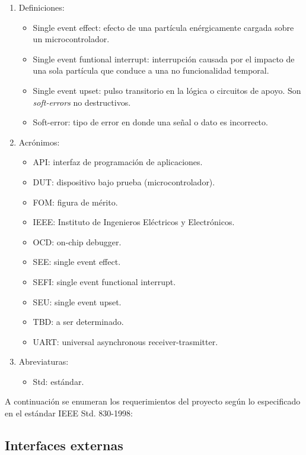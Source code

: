 \documentclass[
11pt, %
]{charter}
\begin{document}
\begin{enumerate}
	\item Definiciones:
	\begin{itemize}
		\item Single event effect: efecto de una partícula enérgicamente cargada sobre un microcontrolador.
		\item Single event funtional interrupt: interrupción causada por el impacto de una sola partícula que conduce a una no funcionalidad temporal.
		\item Single event upset: pulso transitorio en la lógica o circuitos de apoyo. Son \emph{soft-errors} no destructivos.
		\item Soft-error: tipo de error en donde una señal o dato es incorrecto.
	\end{itemize}
	\item Acrónimos:
	\begin{itemize}
		\item API: interfaz de programación de aplicaciones.
		\item DUT: dispositivo bajo prueba (microcontrolador).
		\item FOM: figura de mérito.
		\item IEEE: Instituto de Ingenieros Eléctricos y Electrónicos.
		\item OCD: on-chip debugger.
		\item SEE: single event effect.
		\item SEFI: single event functional interrupt.
		\item SEU: single event upset.
		\item TBD: a ser determinado.
		\item UART: universal asynchronous receiver-trasmitter.
	\end{itemize}
	\item Abreviaturas:
	\begin{itemize}
		\item Std: estándar.
	\end{itemize}
\end{enumerate}

A continuación se enumeran los requerimientos del proyecto según lo especificado en el estándar IEEE Std. 830-1998:

\subsection{Interfaces externas}
\label{sub:interfacesExternas}
\end{document}
